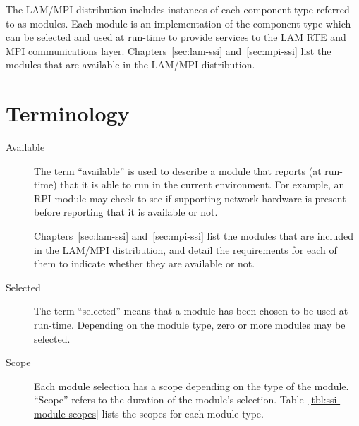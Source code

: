 The LAM/MPI distribution includes instances of each component type
referred to as modules.  Each module is an implementation of the
component type which can be selected and used at run-time to provide
services to the LAM RTE and MPI communications layer.
Chapters~\ref{sec:lam-ssi} and~\ref{sec:mpi-ssi} list the modules that
are available in the LAM/MPI distribution.


\section{Terminology}

\begin{description}
\item[Available] The term ``available'' is used to describe a module
  that reports (at run-time) that it is able to run in the current
  environment.  For example, an RPI module may check to see if
  supporting network hardware is present before reporting that it is
  available or not.
  
  Chapters~\ref{sec:lam-ssi} and~\ref{sec:mpi-ssi} list the modules
  that are included in the LAM/MPI distribution, and detail the
  requirements for each of them to indicate whether they are available
  or not.
  
\item[Selected] The term ``selected'' means that a module has been
  chosen to be used at run-time.  Depending on the module type, zero
  or more modules may be selected.
  
\item[Scope] Each module selection has a scope depending on the type
  of the module.  ``Scope'' refers to the duration of the module's
  selection.  Table~\ref{tbl:ssi-module-scopes} lists the scopes for
  each module type.
\end{description}

